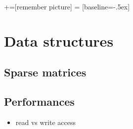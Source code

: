 %
%
%
%
%

\date{January 7 2008}



+=[remember picture]
 = [baseline=-.5ex]

\everymath{\displaystyle}

\subtitle{}

\begin{frame}
  \maketitle
\end{frame}

\begin{frame}
  \tableofcontents
\end{frame}

\section{Data structures}
\label{sec:data-structures}

\subsection{Sparse matrices}
\label{sec:sparse-matrices}

\begin{frame}{}
  
\end{frame}

\subsection{Performances}
\label{sec:performances}


\begin{frame}{}
  \begin{itemize}
  \item read vs write access
  \end{itemize}
\end{frame}

